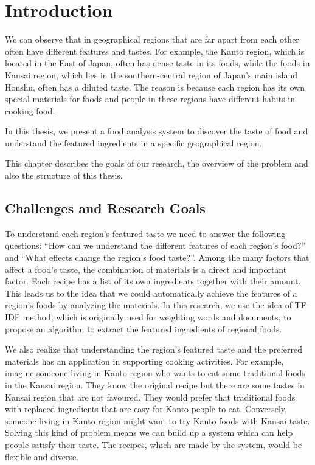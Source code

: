 \chapter{Introduction}\label{chap:intro}

We can observe that in geographical regions that are far apart from each other often have different features and tastes. For example, the Kanto region, which is located in the East of Japan, often has dense taste in its foods, while the foods in Kansai region, which lies in the southern-central region of Japan's main island Honshu, often has a diluted taste. The reason is because each region has its own special materials for foods and people in these regions have different habits in cooking food.

In this thesis, we present a food analysis system to discover the taste of food and understand the featured ingredients in a specific geographical region.

This chapter describes the goals of our research, the overview of the problem and also the structure of this thesis.

\clearpage


\section{Challenges and Research Goals}\label{sec:challenge}

\par To understand each region's featured taste we need to answer the following questions: ``How can we understand the different features of each region's food?'' and ``What effects change the region's food taste?''. Among the many factors that affect a food's taste, the combination of materials is a direct and important factor. Each recipe has a list of its own ingredients together with their amount. This leads us to the idea that we could automatically achieve the features of a region's foods by analyzing the materials. In this research, we use the idea of TF-IDF method, which is originally used for weighting words and documents, to propose an algorithm to extract the featured ingredients of regional foods.  

\par We also realize that understanding the region's featured taste and the preferred materials has an application in supporting cooking activities. For example, imagine someone living in Kanto region who wants to eat some traditional foods in the Kansai region. They know the original recipe but there are some tastes in Kansai region that are not favoured. They would prefer that traditional foods with replaced ingredients that are easy for Kanto people to eat. Conversely, someone living in Kanto region might want to try Kanto foods with Kansai taste. Solving this kind of problem means we can build up a system which can help people satisfy their taste. The recipes, which are made by the system, would be flexible and diverse.

